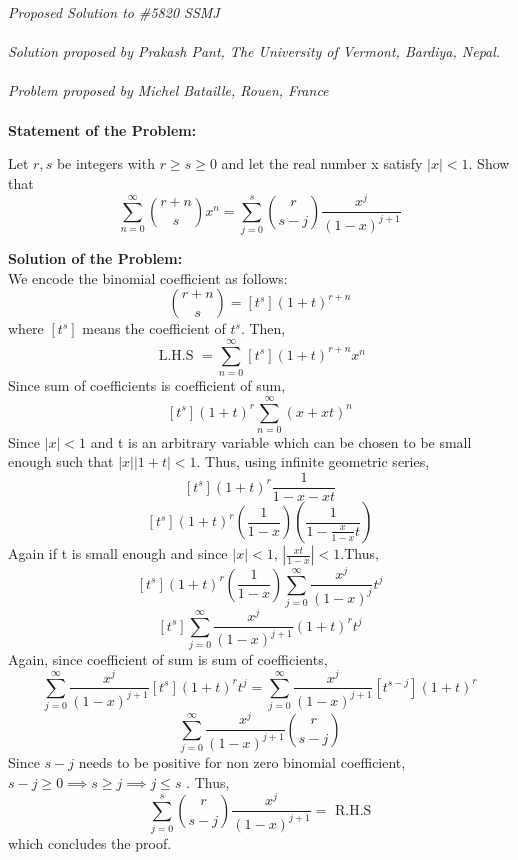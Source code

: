 \documentclass[12pt]{article}
\begin{document}
\textit{Proposed Solution to \#5820 SSMJ }\\ \\
\textit{Solution proposed by Prakash Pant, The University of Vermont, Bardiya, Nepal.}\\ \\
\textit{Problem proposed by Michel Bataille, Rouen, France
} \\ \\
\textbf{Statement of the Problem:}

Let \( r,s \)  be integers with \( r \ge s \ge 0\) and let the real number x satisfy \( |x| < 1\). Show that 
\[ \sum_{n=0}^{\infty} \binom{r+n}{s} x^n = \sum_{j=0}^{s} \binom{r}{s-j} \frac{x^j}{(1-x)^{j+1}}
\]

\textbf{Solution of the Problem:} \\

We encode the binomial coefficient as follows: 
\[ \binom{r+n}{s} = [t^s] (1+t)^{r+n}\]
where \( [t^s] \) means the coefficient of \( t^s\). 
Then, 
\[\text{ L.H.S }= \sum_{n=0}^{\infty} [t^s](1+t)^{r+n} x^n\]
Since sum of coefficients is coefficient of sum,
\[ [t^s](1+t)^r \sum_{n=0}^{\infty} (x+xt)^n \]
Since \(|x|< 1\) and t is an arbitrary variable which can be chosen to be small enough such that \( |x||1+t|<1\). Thus, using infinite geometric series, 
\[ [t^s] (1+t)^r \frac{1}{1-x-xt}\]
\[ [t^s] (1+t)^r \left(  \frac{1}{1-x} \right)  \left( \frac{1}{1-\frac{x}{1-x} t } \right) \]
Again if t is small enough and since \( |x|<1\), \(\left| \frac{xt}{1-x} \right| < 1 \).Thus,
\[ [t^s] (1+t)^r \left(\frac{1}{1-x} \right) \sum_{j=0}^{\infty} \frac{x^j}{(1-x)^j} t^j  \]
\[ [t^s] \sum_{j=0}^{\infty} \frac{x^j}{(1-x)^{j+1}} (1+t)^r t^j\]
Again, since coefficient of sum is sum of coefficients, 
\[  \sum_{j=0}^{\infty} \frac{x^j}{(1-x)^{j
+1}} [t^s] (1+t)^r t^j  = \sum_{j=0}^{\infty} \frac{x^j}{(1-x)^{j
+1}} [t^{s-j}] (1+t)^r\]
\[ \sum_{j=0}^{\infty} \frac{x^j}{(1-x)^{j
+1}} \binom{r}{s-j}\]
Since \( s-j \) needs to be positive for non zero binomial coefficient, \( s-j \ge 0 \implies s \ge j \implies j \le s \) . Thus, 
\[ \sum_{j=0}^{s} \binom{r}{s-j} \frac{x^j}{(1-x)^{j
+1}}  = \text{ R.H.S}\]
which concludes the proof. 
\end{document}
